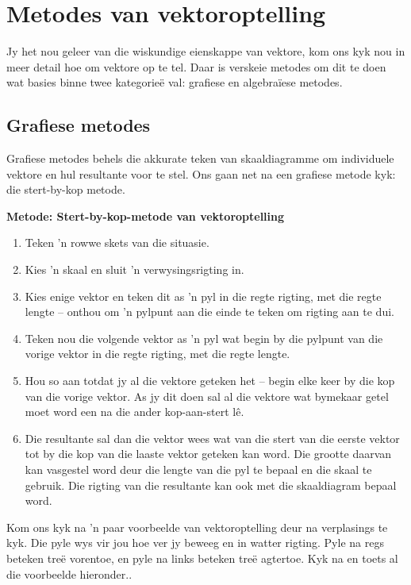 \section{Metodes van vektoroptelling}

Jy het nou geleer van die wiskundige eienskappe van vektore, kom ons kyk nou in meer detail hoe om vektore op te tel. Daar is verskeie metodes om dit te doen wat basies binne twee kategorieë val: grafiese en algebraïese metodes.

\subsection*{Grafiese metodes}
Grafiese metodes behels die akkurate teken van skaaldiagramme om individuele vektore en hul resultante voor te stel. Ons gaan net na een grafiese metode kyk: die stert-by-kop metode.

\textbf{Metode: Stert-by-kop-metode van vektoroptelling}
\begin{enumerate}[noitemsep, label=\textbf{\arabic*}.]
\item{Teken  'n rowwe skets van die situasie.}
\item{Kies  'n skaal en sluit  'n verwysingsrigting in.}
\item{Kies enige vektor en teken dit as  'n pyl in die regte rigting, met die regte lengte -- onthou om  'n pylpunt aan die einde te teken om rigting aan te dui.}
\item{Teken nou die volgende vektor as  'n pyl wat begin by die pylpunt van die vorige vektor in die regte rigting, met die regte lengte.}
\item{Hou so aan totdat jy al die vektore geteken het -- begin elke keer by die kop van die vorige vektor. As jy dit doen sal al die vektore wat bymekaar getel moet word een na die ander kop-aan-stert l\^{e}.}
\item{Die resultante sal dan die vektor wees wat van die stert van die eerste vektor tot by die kop van die laaste vektor geteken kan word. Die grootte daarvan kan vasgestel word deur die lengte van die pyl te bepaal en die skaal te gebruik. Die rigting van die resultante kan ook met die skaaldiagram bepaal word. }
\end{enumerate} \par


Kom ons kyk na  'n paar voorbeelde van vektoroptelling deur na verplasings te kyk. Die pyle wys vir jou hoe ver jy beweeg en in watter rigting. Pyle na regs beteken treë vorentoe, en pyle na links beteken treë agtertoe. Kyk na en toets al die voorbeelde hieronder..\par 

